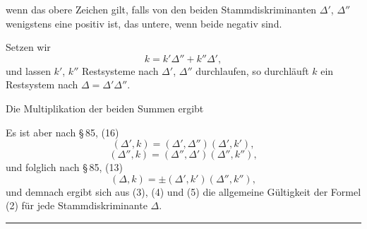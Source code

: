 
wenn das obere Zeichen gilt, falls von den beiden Stammdiskriminanten $\Delta'$, $\Delta''$ wenigstens eine positiv ist, das untere, wenn beide negativ sind.

Setzen wir
\[
k = k'\Delta'' + k''\Delta',
\]
und lassen $k'$, $k''$ Restsysteme nach $\Delta'$, $\Delta''$ durchlaufen, so durchläuft $k$ ein Restsystem nach $\Delta = \Delta'\Delta''$.

Die Multiplikation der beiden Summen
ergibt

Es ist aber nach \S\,85, (16)
\[
(\Delta',k) = (\Delta',\Delta'')(\Delta',k'),
\]
\[
(\Delta'',k) = (\Delta'',\Delta')(\Delta'',k''),
\]
und folglich nach \S\,85, (13)
\[
(\Delta,k) = \pm(\Delta',k')(\Delta'',k''),
\]
und demnach ergibt sich aus (3), (4) und (5) die allgemeine Gültigkeit der Formel (2) für jede Stammdiskriminante $\Delta$.

\begin{center}\rule{0.2\linewidth}{0.4pt}\end{center}
